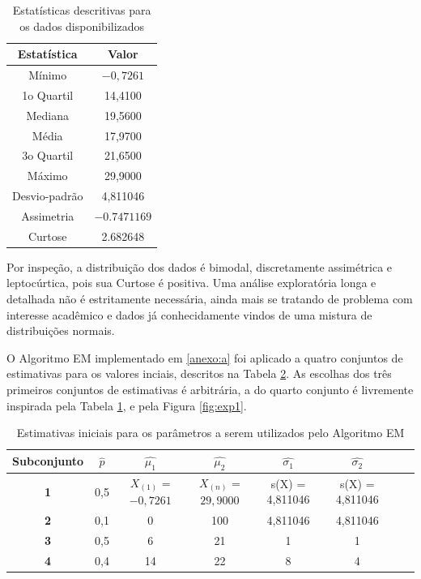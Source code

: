 \documentclass[
	article,			%
	11pt,				%
	oneside,			%
	a4paper,			%
	english,			%
	brazil,				%
	sumario=tradicional
	]{abntex2}
\begin{document}
\begin{table}
	\centering
	\begin{tabular}{c|c}
	Estatística & Valor \\\hline
    Mínimo & $-0,7261$ \\
    1o Quartil & 14,4100 \\
    Mediana & 19,5600 \\
    Média & 17,9700 \\
    3o Quartil & 21,6500 \\
    Máximo & 29,9000 \\
    Desvio-padrão & 4,811046\\
    Assimetria & $-0.7471169$ \\
    Curtose & 2.682648
  	\end{tabular}
    \caption{Estatísticas descritivas para os dados disponibilizados}
    \label{tab:1}
\end{table}

Por inspeção, a distribuição dos dados é bimodal, discretamente assimétrica e leptocúrtica, pois sua Curtose é positiva. Uma análise exploratória longa e detalhada não é estritamente necessária, ainda mais se tratando de problema com interesse acadêmico e dados já conhecidamente vindos de uma mistura de distribuições normais.


O Algoritmo EM implementado em \ref{anexo:a} foi aplicado a quatro conjuntos de estimativas para os valores inciais, descritos na Tabela \ref{tab:2}. As escolhas dos três primeiros conjuntos de estimativas é arbitrária, a do quarto conjunto é livremente inspirada pela Tabela \ref{tab:1}, e pela Figura \ref{fig:exp1}.

\begin{table}[H]
	\centering
	\begin{tabular}{c|ccccccc}
   	Subconjunto &$\hat{p}$ & $\hat{\mu_1}$ & $\hat{\mu_2}$ & $\hat{\sigma_1}$ & $\hat{\sigma_2}$ \\\hline
    \textbf{1} & 0,5& $X_{(1)}$ = $-0,7261$ & $X_{(n)}$ = $29,9000$ & s(X) = 4,811046 & s(X) = 4,811046\\
    \textbf{2} &0,1& 0 & 100 & 4,811046 & 4,811046 \\
    \textbf{3} &0,5 &6 & 21 & 1 & 1 \\
    \textbf{4} & 0,4 & 14 & 22 & 8 & 4 \\


  	\end{tabular}
    \caption{Estimativas iniciais para os parâmetros a serem utilizados pelo Algoritmo EM}
    \label{tab:2}
\end{table}
\end{document}
